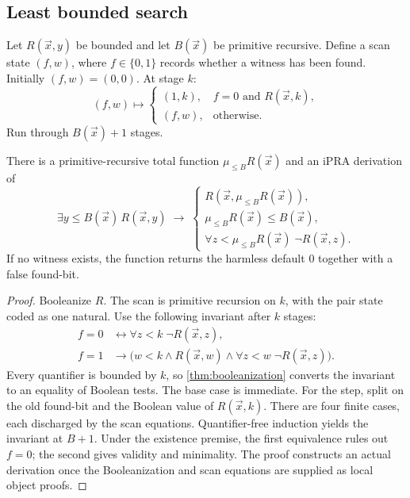 \subsection{Least bounded search}

Let \(R(\vec x,y)\) be bounded and let \(B(\vec x)\) be primitive recursive.  Define a scan state \((f,w)\), where \(f\in\{0,1\}\) records whether a witness has been found.  Initially \((f,w)=(0,0)\).  At stage \(k\):
\[
  (f,w)\longmapsto
  \begin{cases}
    (1,k),&f=0\text{ and }R(\vec x,k),\\
    (f,w),&\text{otherwise.}
  \end{cases}
\]
Run through \(B(\vec x)+1\) stages.

\begin{theorem}\label{thm:least-search}
There is a primitive-recursive total function \(\mu_{\leq B}R(\vec x)\) and an iPRA derivation of
\[
  \exists y\leq B(\vec x)\,R(\vec x,y)
  \;\longrightarrow\;
  \begin{cases}
  R(\vec x,\mu_{\leq B}R(\vec x)),\\
  \mu_{\leq B}R(\vec x)\leq B(\vec x),\\
  \forall z<\mu_{\leq B}R(\vec x)\;\neg R(\vec x,z).
  \end{cases}
\]
If no witness exists, the function returns the harmless default \(0\) together with a false found-bit.
\end{theorem}

\begin{proof}
Booleanize \(R\).  The scan is primitive recursion on \(k\), with the pair state coded as one natural.  Use the following invariant after \(k\) stages:
\[
\begin{aligned}
 f=0 &\longleftrightarrow \forall z<k\;\neg R(\vec x,z),\\
 f=1 &\longrightarrow
   \bigl(w<k\wedge R(\vec x,w)
   \wedge\forall z<w\;\neg R(\vec x,z)\bigr).
\end{aligned}
\]
Every quantifier is bounded by \(k\), so \cref{thm:booleanization} converts the invariant to an equality of Boolean tests.  The base case is immediate.  For the step, split on the old found-bit and the Boolean value of \(R(\vec x,k)\).  There are four finite cases, each discharged by the scan equations.  Quantifier-free induction yields the invariant at \(B+1\).  Under the existence premise, the first equivalence rules out \(f=0\); the second gives validity and minimality.  The proof constructs an actual derivation once the Booleanization and scan equations are supplied as local object proofs.
\end{proof}

